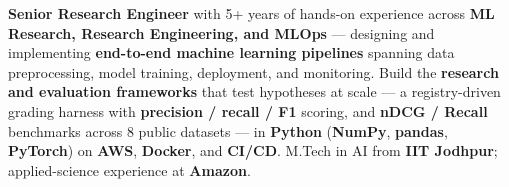 \documentclass[letter,10pt]{article}
\begin{document}

\textbf{Senior Research Engineer} with 5+ years of hands-on experience across \textbf{ML Research, Research Engineering, and MLOps} --- designing and implementing \textbf{end-to-end machine learning pipelines} spanning data preprocessing, model training, deployment, and monitoring.
Build the \textbf{research and evaluation frameworks} that test hypotheses at scale --- a registry-driven grading harness with \textbf{precision / recall / F1} scoring, and \textbf{nDCG / Recall} benchmarks across 8 public datasets --- in \textbf{Python} (\textbf{NumPy}, \textbf{pandas}, \textbf{PyTorch}) on \textbf{AWS}, \textbf{Docker}, and \textbf{CI/CD}.
M.Tech in AI from \textbf{IIT Jodhpur}; applied-science experience at \textbf{Amazon}.
\end{document}

